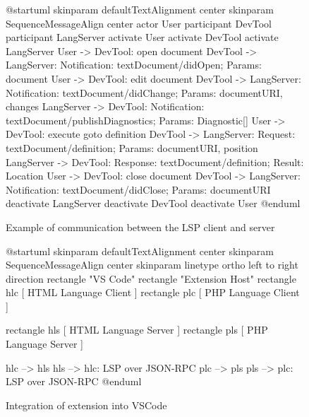 
\iflspCommEx%
\begin{figure}
    \begin{plantuml}
      @startuml
      skinparam defaultTextAlignment center
      skinparam SequenceMessageAlign center
      actor User
      participant DevTool
      participant LangServer
      activate User
      activate DevTool
      activate LangServer
      User -> DevTool: open document
      DevTool -> LangServer: Notification: textDocument/didOpen; Params: document
      User -> DevTool: edit document
      DevTool -> LangServer: Notification: textDocument/didChange; Params: {documentURI, changes}
      LangServer -> DevTool: Notification: textDocument/publishDiagnostics; Params: Diagnostic[]
      User -> DevTool: execute goto definition
      DevTool -> LangServer: Request: textDocument/definition; Params: {documentURI, position}
      LangServer -> DevTool: Response: textDocument/definition; Result: Location
      User -> DevTool: close document
      DevTool -> LangServer: Notification: textDocument/didClose; Params: documentURI
      deactivate LangServer
      deactivate DevTool
      deactivate User
      @enduml
    \end{plantuml}
    \caption{Example of communication between the LSP client and server \cite{lsp}}
    \label{lspCommEx}
\end{figure}
\fi%

\ifvsceArch%
\begin{figure}
    \begin{plantuml}
      @startuml
      skinparam defaultTextAlignment center
      skinparam SequenceMessageAlign center
      skinparam linetype ortho
      left to right direction
        rectangle "VS Code" {
        rectangle "Extension Host" {
        rectangle hlc [
        HTML Language Client
        ]
        rectangle plc [
        PHP Language Client
        ]
        }
        }
        
        rectangle hls [
        HTML Language Server
        ]
        rectangle pls [
        PHP Language Server
        ]
        
        hlc --> hls
        hls --> hlc: LSP over JSON-RPC
        plc --> pls
        pls --> plc: LSP over JSON-RPC
      @enduml
    \end{plantuml}
    \caption{Integration of extension into VSCode\cite{vsclspextman}}
    \label{vsceArch}
\end{figure}
\fi%

